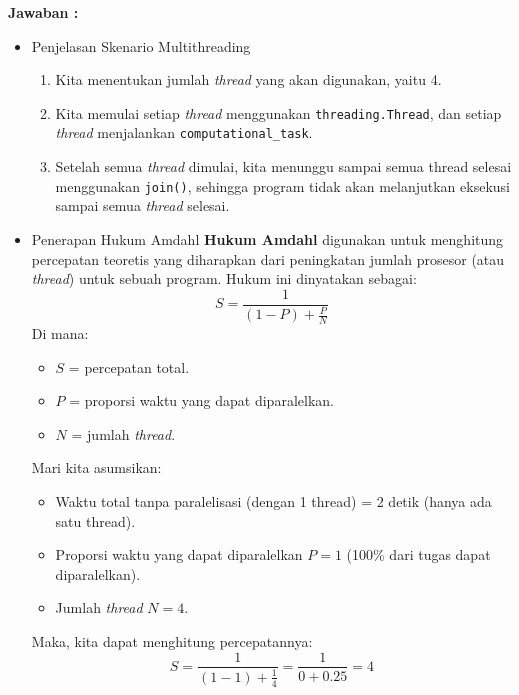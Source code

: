 \documentclass[12pt]{article}
\begin{document}
\textbf{Jawaban : }
\begin{itemize}
    \item Penjelasan Skenario Multithreading
        \begin{enumerate}
            \item Kita menentukan jumlah \textit{thread} yang akan digunakan, yaitu 4.
            \item Kita memulai setiap \textit{thread} menggunakan \texttt{threading.Thread}, dan setiap \textit{thread} menjalankan \texttt{computational\_task}.
            \item Setelah semua \textit{thread} dimulai, kita menunggu sampai semua thread selesai menggunakan \texttt{join()}, sehingga program tidak akan melanjutkan eksekusi sampai semua \textit{thread} selesai.
        \end{enumerate}
    \item Penerapan Hukum Amdahl
        \textbf{Hukum Amdahl} digunakan untuk menghitung percepatan teoretis yang diharapkan dari peningkatan jumlah prosesor (atau \textit{thread}) untuk sebuah program. Hukum ini dinyatakan sebagai:
        \begin{equation}
            S = \frac{1}{(1 - P) + \frac{P}{N}}
        \end{equation}
        Di mana:
        \begin{itemize}
            \item \( S \) = percepatan total.
            \item \( P \) = proporsi waktu yang dapat diparalelkan.
            \item \( N \) = jumlah \textit{thread}.
        \end{itemize}

        Mari kita asumsikan:
        \begin{itemize}
            \item Waktu total tanpa paralelisasi (dengan 1 thread) = 2 detik (hanya ada satu thread).
            \item Proporsi waktu yang dapat diparalelkan \( P = 1 \) (100\% dari tugas dapat diparalelkan).
            \item Jumlah \textit{thread} \( N = 4 \).
        \end{itemize}
        Maka, kita dapat menghitung percepatannya:
\begin{equation}
S = \frac{1}{(1 - 1) + \frac{1}{4}} = \frac{1}{0 + 0.25} = 4
\end{equation}
\end{itemize}
\end{document}
